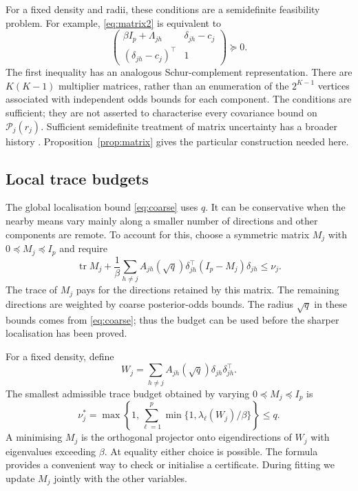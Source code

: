 \documentclass[12pt,a4paper]{article}
\theoremstyle{remark}
\DeclareMathOperator{\tr}{tr}
\begin{document}
For a fixed density and radii, these conditions are a semidefinite feasibility problem. For example, \eqref{eq:matrix2} is equivalent to
\[
 \begin{pmatrix}
  \beta I_p+\Lambda_{jh}&\delta_{jh}-c_j\\
  (\delta_{jh}-c_j)^\top&1
 \end{pmatrix}\succeq0.
\]
The first inequality has an analogous Schur-complement representation. There are $K(K-1)$ multiplier matrices, rather than an enumeration of the $2^{K-1}$ vertices associated with independent odds bounds for each component. The conditions are sufficient; they are not asserted to characterise every covariance bound on $\mathcal P_j(r_j)$. Sufficient semidefinite treatment of matrix uncertainty has a broader history \citep{bental2002}. Proposition~\ref{prop:matrix} gives the particular construction needed here.

\subsection{Local trace budgets}

The global localisation bound \eqref{eq:coarse} uses $q$. It can be conservative when the nearby means vary mainly along a smaller number of directions and other components are remote. To account for this, choose a symmetric matrix $M_j$ with $0\preceq M_j\preceq I_p$ and require
\begin{equation}\label{eq:budget}
 \tr M_j+\frac1\beta\sum_{h\ne j}A_{jh}(\sqrt q)
            \delta_{jh}^\top(I_p-M_j)\delta_{jh}\le\nu_j.
\end{equation}
The trace of $M_j$ pays for the directions retained by this matrix. The remaining directions are weighted by coarse posterior-odds bounds. The radius $\sqrt q$ in these bounds comes from \eqref{eq:coarse}; thus the budget can be used before the sharper localisation has been proved.

For a fixed density, define
\[
 W_j=\sum_{h\ne j}A_{jh}(\sqrt q)\delta_{jh}\delta_{jh}^\top.
\]
The smallest admissible trace budget obtained by varying $0\preceq M_j\preceq I_p$ is
\begin{equation}\label{eq:spectralbudget}
 \nu_j^*=\max\left\{1,\sum_{\ell=1}^p
                \min\{1,\lambda_\ell(W_j)/\beta\}\right\}\le q.
\end{equation}
A minimising $M_j$ is the orthogonal projector onto eigendirections of $W_j$ with eigenvalues exceeding $\beta$. At equality either choice is possible. The formula provides a convenient way to check or initialise a certificate. During fitting we update $M_j$ jointly with the other variables.
\end{document}

